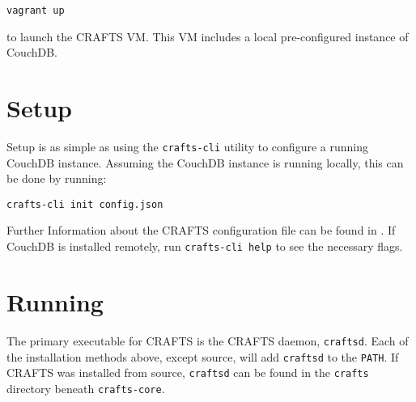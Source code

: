 \texttt{vagrant up}

\noindent
to launch the CRAFTS VM. This VM includes a local pre-configured instance of CouchDB.

\section{Setup}
Setup is as simple as using the \texttt{crafts-cli} utility to configure a running CouchDB instance. Assuming the CouchDB instance is running locally, this can be done by running:

\texttt{crafts-cli init config.json}

\noindent
Further Information about the CRAFTS configuration file can be found in . If CouchDB is installed remotely, run \texttt{crafts-cli help} to see the necessary flags.

\section{Running}
The primary executable for CRAFTS is the CRAFTS daemon, \texttt{craftsd}. Each of the installation methods above, except source, will add \texttt{craftsd} to the \texttt{PATH}. If CRAFTS was installed from source, \texttt{craftsd} can be found in the \texttt{crafts} directory beneath \texttt{crafts-core}.